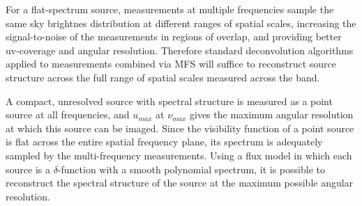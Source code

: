 \documentclass[structabstract]{stylefiles/aa}
\begin{document}
For a flat-spectrum source, measurements at multiple frequencies sample the 
same sky brightnes distribution at different ranges of spatial scales, increasing 
the signal-to-noise of the measurements in regions of overlap, and providing 
better uv-coverage and angular resolution.
Therefore standard deconvolution algorithms applied to measurements combined 
via MFS will suffice to reconstruct source structure across the full range of 
spatial scales measured across the band.

%

A compact, unresolved source with spectral structure is measured as a point
source at all frequencies, and $u_{max}$ at $\nu_{max}$ gives the maximum angular resolution at
which this source can be imaged. Since the visibility function of a point source is flat across
the entire spatial frequency plane, its spectrum is adequately sampled by the
multi-frequency measurements.
Using a flux model in which each source is a $\delta$-function with a smooth 
polynomial spectrum, 
it is possible to reconstruct the spectral structure of the source
at the maximum possible angular resolution.
\end{document}
